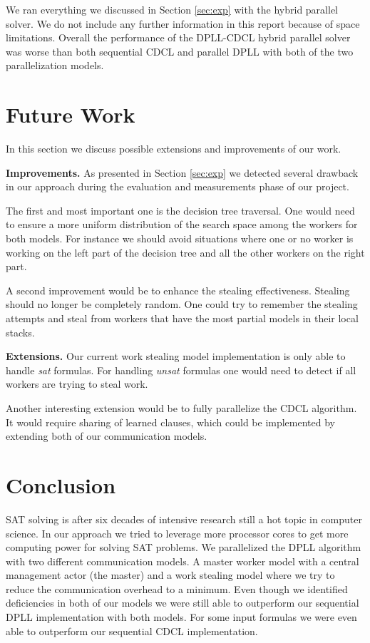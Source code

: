 \documentclass[letterpaper]{article}
\newcommand{\mypar}[1]{{\bf #1.}}
\begin{document}
We ran everything we discussed in Section \ref{sec:exp} with the hybrid parallel solver.
We do not include any further information in this report because of space limitations.
Overall the performance of the DPLL-CDCL hybrid parallel solver was worse than both sequential CDCL and parallel DPLL with both of the two parallelization models.

\section{Future Work}\label{sec:futureWork}
In this section we discuss possible extensions and improvements of our work.

\mypar{Improvements}
As presented in Section \ref{sec:exp} we detected several drawback in our approach during the evaluation and measurements phase of our project.

The first and most important one is the decision tree traversal.
One would need to ensure a more uniform distribution of the search space among the workers for both models.
For instance we should avoid situations where one or no worker is working on the left part of the decision tree and all the other workers on the right part.

A second improvement would be to enhance the stealing effectiveness.
Stealing should no longer be completely random.
One could try to remember the stealing attempts and steal from workers that have the most partial models in their local stacks.

\mypar{Extensions}
Our current work stealing model implementation is only able to handle \textit{sat} formulas.
For handling \textit{unsat} formulas one would need to detect if all workers are trying to steal work.

Another interesting extension would be to fully parallelize the CDCL algorithm.
It would require sharing of learned clauses, which could be implemented by extending both of our communication models.

\section{Conclusion}\label{sec:conclusion}
SAT solving is after six decades of intensive research still a hot topic in computer science.
In our approach we tried to leverage more processor cores to get more computing power for solving SAT problems.
We parallelized the DPLL algorithm with two different communication models.
A master worker model with a central management actor (the master) and a work stealing model where we try to reduce the communication overhead to a minimum.
Even though we identified deficiencies in both of our models we were still able to outperform our sequential DPLL implementation with both models.
For some input formulas we were even able to outperform our sequential CDCL implementation.
\end{document}
